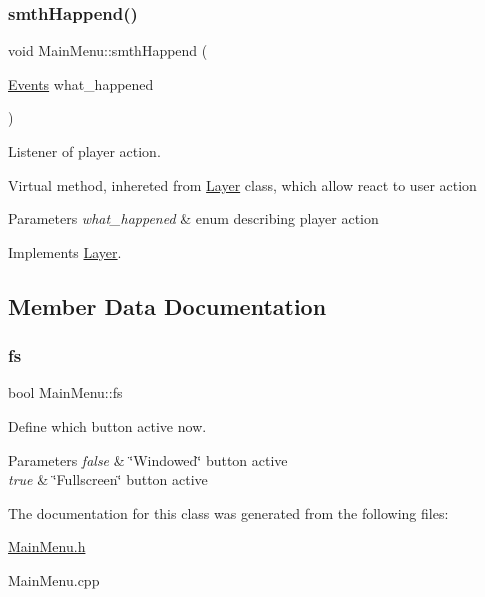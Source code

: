 \subsubsection{\texorpdfstring{smth\+Happend()}{smthHappend()}}
{\footnotesize\ttfamily void Main\+Menu\+::smth\+Happend (\begin{DoxyParamCaption}\item[{\hyperlink{_events_8h_af60e00b78607064c5be6aa9397ea49c1}{Events}}]{what\+\_\+happened }\end{DoxyParamCaption})\hspace{0.3cm}{\ttfamily [virtual]}}



Listener of player action. 

Virtual method, inhereted from \hyperlink{class_layer}{Layer} class, which allow react to user action 
\begin{DoxyParams}{Parameters}
{\em what\+\_\+happened} & enum describing player action \\
\hline
\end{DoxyParams}


Implements \hyperlink{class_layer_a41318993a0f6c7ba3bc6d964f7802c10}{Layer}.



\subsection{Member Data Documentation}
\mbox{\label{class_main_menu_a22890c1716e56c182b500088c13d7f34}} 
\subsubsection{\texorpdfstring{fs}{fs}}
{\footnotesize\ttfamily bool Main\+Menu\+::fs\hspace{0.3cm}{\ttfamily [private]}}



Define which button active now. 


\begin{DoxyParams}{Parameters}
{\em false} & \char`\"{}\+Windowed\char`\"{} button active \\
\hline
{\em true} & \char`\"{}\+Fullscreen\char`\"{} button active \\
\hline
\end{DoxyParams}


The documentation for this class was generated from the following files\+:\begin{DoxyCompactItemize}
\item 
\hyperlink{_main_menu_8h}{Main\+Menu.\+h}\item 
Main\+Menu.\+cpp\end{DoxyCompactItemize}
